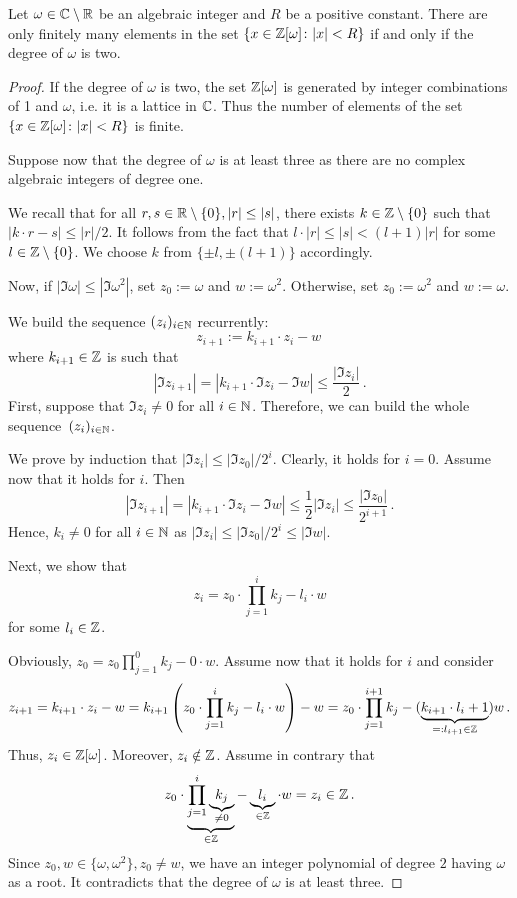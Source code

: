 \begin{lem}
\label{lem:numElemCC}
Let $\omega\in \mathbb{C}\setminus\mathbb{R}$ be an algebraic integer and $R$ be a positive constant. There are only finitely many elements in the set $\left\{x \in\mathbb{Z}[\omega] \colon |x|<R\right\}$ if and only if the degree of $\omega$ is two.  
\end{lem}
\begin{proof}
If the degree of $\omega$ is two, the set $\mathbb{Z}[\omega]$ is generated by integer combinations of 1 and $\omega$, i.e. it is a lattice in $\mathbb{C}$. Thus the number of elements of the set $\left\{x \in\mathbb{Z}[\omega] \colon |x|<R\right\}$ is finite.

Suppose now that the degree of $\omega$ is at least three as there are no complex algebraic integers of degree one. 


We recall that for all $r,s\in\mathbb{R}\setminus\{0\}, |r|\leq|s|$, there exists $k\in\mathbb{Z}\setminus\{0\}$ such that $|k\cdot r -s|\leq |r|/2$. It follows from the fact that $l\cdot |r| \leq |s| <(l+1)|r| $ for some $l\in\mathbb{Z}\setminus\{0\}$. We choose $k$ from $\{\pm l,\pm(l+1)\}$ accordingly. 
 
Now, if $|\Im \omega|\leq|\Im \omega^2|$, set $z_0:=\omega$ and $w:=\omega^2$. Otherwise, set $z_0:=\omega^2$ and $w:=\omega$.   

We build the sequence $(z_i)_{i\in\mathbb{N}}$ recurrently:
$$
z_{i+1}:=k_{i+1} \cdot z_{i}-w\, 
$$
where $k_{i+1}\in\mathbb{Z}$ is such that 
$$
|\Im z_{i+1}|=|k_{i+1} \cdot\Im z_{i}-\Im w|\leq \frac{|\Im z_{i}|}{2}\,.
$$
First, suppose that $\Im z_{i} \neq 0$ for all $i\in\mathbb{N}$. Therefore, we can build the whole sequence~$(z_i)_{i\in\mathbb{N}}$.

We prove by induction that $|\Im z_i|\leq |\Im z_0|/2^i$. Clearly, it holds for $i=0$. Assume now that it holds for $i$. Then 
$$
|\Im z_{i+1}|= |k_{i+1} \cdot \Im z_{i}- \Im w|\leq \frac{1}{2}|\Im z_i|\leq \frac{|\Im z_0|}{2^{i+1}}\,. 
$$
Hence, $k_i\neq 0$ for all $i\in\mathbb{N}$ as $|\Im z_i|\leq |\Im z_0|/2^i \leq |\Im w|$.

Next, we show that
$$
z_i=z_0 \cdot \prod_{j=1}^i k_j- l_i\cdot w
$$
for some $l_i\in\mathbb{Z}$. 

Obviously, $z_0=z_0 \prod_{j=1}^0 k_j - 0\cdot w$. Assume now that it holds for $i$ and consider
$$
z_{i+1}=k_{i+1} \cdot z_{i}-w= k_{i+1}\left(z_0 \cdot \prod_{j=1}^i k_j- l_i\cdot w\right) -w=z_0 \cdot \prod_{j=1}^{i+1} k_j - (\underbrace{k_{i+1}\cdot l_i +1}_{=:l_{i+1}\in\mathbb{Z}})w\,.
$$
Thus, $z_i\in\mathbb{Z}[\omega]$. Moreover, $z_i\notin \mathbb{Z}$. Assume in contrary that 
$$
z_0 \cdot \underbrace{\prod_{j=1}^i \underbrace{k_j}_{\neq0}}_{\in\mathbb{Z}}- \underbrace{l_i}_{\in\mathbb{Z}}\cdot w = z_i\in \mathbb{Z}\,.
$$
Since $z_0,w\in\{\omega, \omega^2\}, z_0\neq w$, we have an integer polynomial of degree $2$ having $\omega$ as a root. It contradicts that the degree of $\omega$ is at least three.




\end{proof}
